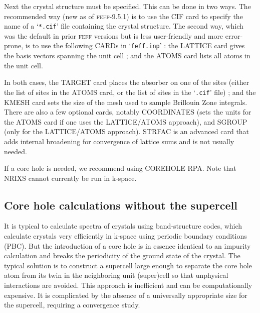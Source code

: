 \documentclass[11pt,oneside]{report} %
\newcommand{\program}[1]{\textsc{#1}}
\newcommand{\feff}{\program{feff}}
\newcommand{\file}[1]{`\texttt{#1}'}
\begin{document}
Next the crystal structure must be specified.  This can be done in two ways.  The recommended way (new as of {\feff}-9.5.1) is to use the CIF card to specify the name of a \file{*.cif} file containing the crystal structure.  The second way, which was the default in prior {\feff} versions but is less user-friendly and more error-prone, is to use the following CARDs in \file{feff.inp} : the LATTICE card gives the basis vectors spanning the unit cell ; and the ATOMS card lists all atoms in the unit cell. 

In both cases, the TARGET card places the absorber on one of the sites (either the list of sites in the ATOMS card, or the list of sites in the \file{.cif} file) ; and the KMESH card sets the size of the mesh used to sample Brillouin Zone integrals.  There are also a few optional cards, notably COORDINATES (sets the units for the ATOMS card if one uses the LATTICE/ATOMS approach), and SGROUP (only for the LATTICE/ATOMS approach).  STRFAC is an advanced card that adds internal broadening for convergence of lattice sums and is not usually needed.


If a core hole is needed, we recommend using COREHOLE RPA.  Note that NRIXS cannot currently be run in k-space.


\subsection{Core hole calculations without the supercell}
It is typical to calculate spectra of crystals using band-structure codes, which calculate crystals very efficiently in k-space using periodic boundary conditions (PBC).  But the introduction of a core hole is in essence identical to an impurity calculation and breaks the periodicity of the ground state of the crystal.  The typical solution is to construct a supercell large enough to separate the core hole atom from its twin in the neighboring unit (super)cell so that unphysical interactions are avoided.  This approach is inefficient and can be computationally expensive.  It is complicated by the absence of a universally appropriate size for the supercell, requiring a convergence study.
\end{document}
